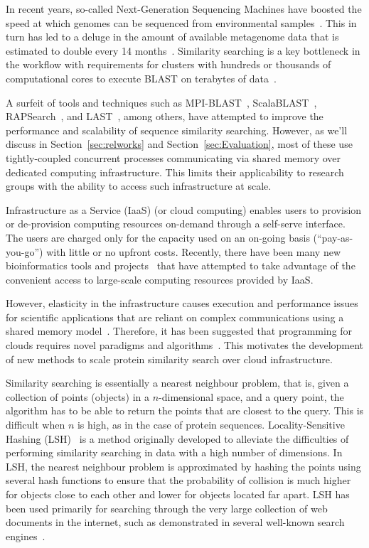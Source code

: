 \documentclass[titlepage]{csetr}
\begin{document}
In recent years, so-called Next-Generation Sequencing Machines have boosted the speed at which genomes can be sequenced from environmental samples~\cite{shendure_next-generation_2008,loman_high-throughput_2012}. This in turn has led to a deluge in the amount of available metagenome data that is estimated to double every 14 months~\cite{wooley_metagenomics_2010}. Similarity searching is a key bottleneck in the workflow with requirements for clusters with hundreds or thousands of computational cores to execute BLAST on terabytes of data~\cite{CAMERA}. 

A surfeit of tools and techniques such as MPI-BLAST~\cite{MPIBLAST,lin_coordinating_2011}, ScalaBLAST~\cite{oehmen_scalablast_2006}, RAPSearch~\cite{RAPSearch,RAPSearch2}, and LAST~\cite{LAST}, among others, have attempted to improve the performance and scalability of sequence similarity searching. However, as we'll discuss in Section~\ref{sec:relworks} and Section~\ref{sec:Evaluation}, most of these use tightly-coupled concurrent processes communicating via shared memory over dedicated computing infrastructure. This limits their applicability to research groups with the ability to access such infrastructure at scale.  

Infrastructure as a Service (IaaS) (or cloud computing) enables users to provision or de-provision computing resources on-demand through a self-serve interface. The users are charged only for the capacity used on an on-going basis (“pay-as-you-go”) with little or no upfront costs. Recently, there have been many new bioinformatics tools and projects~\cite{odriscoll_big_2013,CloudBLAST,wilkening_using_2009,wall_cloud_2010} that have attempted to take advantage of the convenient access to large-scale computing resources provided by IaaS. 

However, elasticity in the infrastructure causes execution and performance issues for scientific applications that are reliant on complex communications using a shared memory model~\cite{ekanayake_high_2010,he_case_2010}. Therefore, it has been suggested that programming for clouds requires novel paradigms and algorithms~\cite{larus_programming_2010}. This motivates the development of new methods to scale protein similarity search over cloud infrastructure.

Similarity searching is essentially a nearest neighbour problem, that is, given a collection of points (objects) in a $n$-dimensional space, and a query point, the algorithm has to be able to return the points that are closest to the query. This is difficult when $n$ is high, as in the case of protein sequences. Locality-Sensitive Hashing (LSH)~\cite{LSH} is a method originally developed to alleviate the difficulties of performing similarity searching in data with a high number of dimensions.  In LSH, the nearest neighbour problem is approximated by hashing the points using several hash functions to ensure that the probability of collision is much higher for objects close to each other and lower for objects located far apart.  LSH has been used primarily for searching through the very large collection of web documents in the internet, such as demonstrated in several well-known search engines~\cite{BroderWeb, Minhash, MankuSimhash}.
\end{document}

